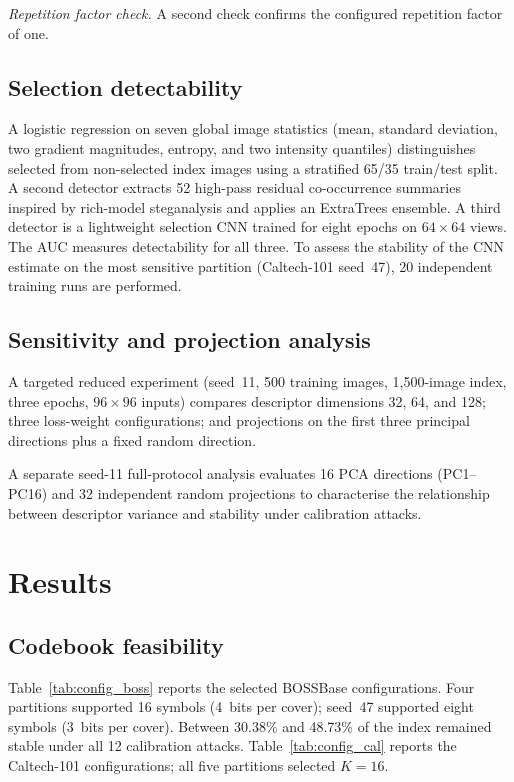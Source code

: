 ﻿\documentclass[10pt,journal]{IEEEtran}
\begin{document}
\textit{Repetition factor check.} A second check confirms the
configured repetition factor of one.

\subsection{Selection detectability}
\label{subsec:detect_proto}

A logistic regression on seven global image statistics (mean, standard
deviation, two gradient magnitudes, entropy, and two intensity quantiles)
distinguishes selected from non-selected index images using a stratified
65/35 train/test split. A second detector extracts 52 high-pass residual
co-occurrence summaries inspired by rich-model steganalysis
\cite{fridrich2012rich} and applies an ExtraTrees ensemble. A third
detector is a lightweight selection CNN trained for eight epochs on
$64\times64$ views. The AUC measures detectability for all three. To
assess the stability of the CNN estimate on the most sensitive partition
(Caltech-101 seed~47), 20 independent training runs are performed.

\subsection{Sensitivity and projection analysis}
\label{subsec:sens_proto}

A targeted reduced experiment (seed~11, 500 training images, 1{,}500-image
index, three epochs, $96\times96$ inputs) compares descriptor dimensions
32, 64, and 128; three loss-weight configurations; and projections on
the first three principal directions plus a fixed random direction.

A separate seed-11 full-protocol analysis evaluates 16 PCA directions
(PC1--PC16) and 32 independent random projections to characterise the
relationship between descriptor variance and stability under
calibration attacks.

\section{Results}
\label{sec:results}

\subsection{Codebook feasibility}

Table~\ref{tab:config_boss} reports the selected BOSSBase configurations.
Four partitions supported 16 symbols (4~bits per cover); seed~47
supported eight symbols (3~bits per cover). Between 30.38\% and 48.73\%
of the index remained stable under all 12 calibration attacks.
Table~\ref{tab:config_cal} reports the Caltech-101 configurations; all
five partitions selected $K{=}16$.
\end{document}
